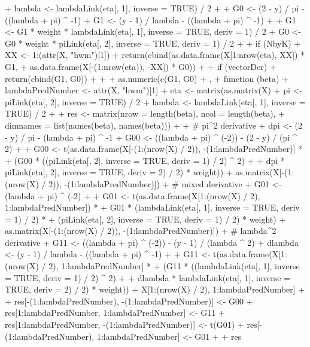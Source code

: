 \documentclass[nojss]{jss}
\newcommand{\1}{\mathcal{I}} \newcommand{\bZero}{\boldsymbol{0}}
\begin{document}
\begin{CodeChunk}
\begin{CodeInput}
{{{+         lambda <- lambdaLink(eta[, 1], inverse = TRUE) / 2
+
+         G0 <- (2 - y) / pi     - ((lambda + pi) ^ -1)
+         G1 <- (y - 1) / lambda - ((lambda + pi) ^ -1)
+
+         G1 <- G1 * weight * lambdaLink(eta[, 1], inverse = TRUE, deriv = 1) / 2
+         G0 <- G0 * weight *     piLink(eta[, 2], inverse = TRUE, deriv = 1) / 2
+
+         if (NbyK) {
+           XX <- 1:(attr(X, "hwm")[1])
+           return(cbind(as.data.frame(X[1:nrow(eta), XX]) * G1,
+                        as.data.frame(X[-(1:nrow(eta)), -XX]) * G0))
+         }
+         if (vectorDer) {
+           return(cbind(G1, G0))
+         }
+
+         as.numeric(c(G1, G0) %
+       },
+       function (beta) {
+         lambdaPredNumber <- attr(X, "hwm")[1]
+         eta <- matrix(as.matrix(X) %
+         pi     <-     piLink(eta[, 2], inverse = TRUE) / 2
+         lambda <- lambdaLink(eta[, 1], inverse = TRUE) / 2
+
+         res <- matrix(nrow = length(beta), ncol = length(beta),
+                       dimnames = list(names(beta), names(beta)))
+
+         # pi^2 derivative
+         dpi <- (2 - y) / pi - (lambda + pi) ^ -1
+         G00 <- ((lambda + pi) ^ (-2)) - (2 - y) / (pi ^ 2)
+
+         G00 <- t(as.data.frame(X[-(1:(nrow(X) / 2)), -(1:lambdaPredNumber)] *
+         (G00 * ((piLink(eta[, 2], inverse = TRUE, deriv = 1) / 2) ^ 2) +
+         dpi * piLink(eta[, 2], inverse = TRUE, deriv = 2) / 2) * weight)) %
+         as.matrix(X[-(1:(nrow(X) / 2)), -(1:lambdaPredNumber)])
+         # mixed derivative
+         G01 <- (lambda + pi) ^ (-2)
+
+         G01 <- t(as.data.frame(X[1:(nrow(X) / 2), 1:lambdaPredNumber]) *
+         G01 * (lambdaLink(eta[, 1], inverse = TRUE, deriv = 1) / 2) *
+         (piLink(eta[, 2], inverse = TRUE, deriv = 1) / 2) * weight) %
+         as.matrix(X[-(1:(nrow(X) / 2)), -(1:lambdaPredNumber)])
+         # lambda^2 derivative
+         G11 <- ((lambda + pi) ^ (-2)) - (y - 1) / (lambda ^ 2)
+         dlambda <- (y - 1) / lambda - ((lambda + pi) ^ -1)
+
+         G11 <- t(as.data.frame(X[1:(nrow(X) / 2), 1:lambdaPredNumber] *
+         (G11 * ((lambdaLink(eta[, 1], inverse = TRUE, deriv = 1) / 2) ^ 2) +
+         dlambda * lambdaLink(eta[, 1], inverse = TRUE, deriv = 2) / 2) * weight)) %
+         X[1:(nrow(X) / 2), 1:lambdaPredNumber]
+
+         res[-(1:lambdaPredNumber), -(1:lambdaPredNumber)] <- G00
+         res[1:lambdaPredNumber, 1:lambdaPredNumber] <- G11
+         res[1:lambdaPredNumber, -(1:lambdaPredNumber)] <- t(G01)
+         res[-(1:lambdaPredNumber), 1:lambdaPredNumber] <- G01
+
+         res
}}}
\end{CodeInput}
\end{CodeChunk}
\end{document}
